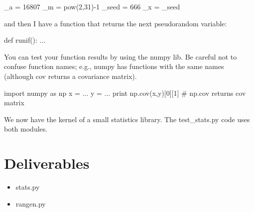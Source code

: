 \begin{fullwidth}
\begin{pyverbatim}
_a = 16807
_m = pow(2,31)-1
_seed = 666
_x = _seed
\end{pyverbatim}

\noindent and then I have a function that returns the next pseudorandom variable:
 
\begin{pyverbatim}
 def runif():
     ...
\end{pyverbatim}

You can test your function results by using the numpy lib. Be careful not to confuse function names; e.g., numpy has functions with the same names (although cov returns a covariance matrix).

\begin{pyverbatim}
import numpy as np
x = ...
y = ...
print np.cov(x,y)[0][1] # np.cov returns cov matrix
\end{pyverbatim}

We now have the kernel of a small statistics library.  The test\_stats.py code uses both modules.


\section{Deliverables}

\begin{itemize}
\item stats.py
\item rangen.py
\end{itemize}

\end{fullwidth}

